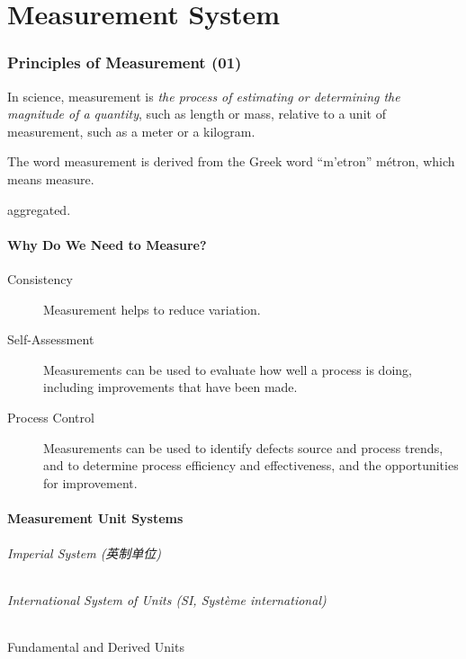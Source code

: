 \documentclass[a4paper,UTF8]{article}
\theoremstyle{mystyle}{
  \newtheorem{law}{Law}
}
\begin{document}


\tableofcontents
\newpage
\part{Measurement System}
\section{Principles of Measurement (01)}
In science, measurement is \emph{the process of estimating or
determining the magnitude of a quantity}, such as length
or mass, relative to a unit of measurement, such as a
meter or a kilogram.

The word measurement is derived from the Greek word ``\textgreek{m'etron}'' m\'etron, 
which means measure.

aggregated.
\subsection{Why Do We Need to Measure?}
\begin{mdframed}

\begin{description}
\item[Consistency] Measurement helps to reduce variation.
\item[Self-Assessment] Measurements can be used to evaluate how well a process is doing, including improvements that have been made.
\item[Process Control] Measurements can be used to identify defects source and process trends, and to determine process efficiency and effectiveness, and the opportunities for improvement.
\end{description}

\end{mdframed}



\subsection{Measurement Unit Systems}

\paragraph{Imperial System (英制单位)}

\paragraph{International System of Units (SI, Syst\`{e}me international)}
Fundamental and Derived Units
\end{document}
